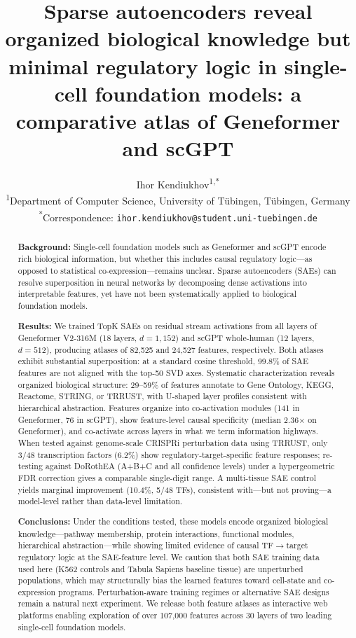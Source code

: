 \documentclass[onecolumn]{article}
\title{\textbf{Sparse autoencoders reveal organized biological knowledge but minimal regulatory logic in single-cell foundation models: a comparative atlas of Geneformer and scGPT}}
\author{Ihor Kendiukhov\textsuperscript{1,*}\\[6pt]
\textsuperscript{1}Department of Computer Science, University of T\"ubingen, T\"ubingen, Germany\\
\textsuperscript{*}Correspondence: \texttt{ihor.kendiukhov@student.uni-tuebingen.de}}
\date{}
\begin{document}
\maketitle

\begin{abstract}

\textbf{Background:}
Single-cell foundation models such as Geneformer and scGPT encode rich biological information, but whether this includes causal regulatory logic---as opposed to statistical co-expression---remains unclear. Sparse autoencoders (SAEs) can resolve superposition in neural networks by decomposing dense activations into interpretable features, yet have not been systematically applied to biological foundation models.

\textbf{Results:}
We trained TopK SAEs on residual stream activations from all layers of Geneformer V2-316M (18 layers, $d{=}1{,}152$) and scGPT whole-human (12 layers, $d{=}512$), producing atlases of 82,525 and 24,527 features, respectively. Both atlases exhibit substantial superposition: at a standard cosine threshold, 99.8\% of SAE features are not aligned with the top-50 SVD axes. Systematic characterization reveals organized biological structure: 29--59\% of features annotate to Gene Ontology, KEGG, Reactome, STRING, or TRRUST, with U-shaped layer profiles consistent with hierarchical abstraction. Features organize into co-activation modules (141 in Geneformer, 76 in scGPT), show feature-level causal specificity (median 2.36$\times$ on Geneformer), and co-activate across layers in what we term information highways. When tested against genome-scale CRISPRi perturbation data using TRRUST, only 3/48 transcription factors (6.2\%) show regulatory-target-specific feature responses; re-testing against DoRothEA (A+B+C and all confidence levels) under a hypergeometric FDR correction gives a comparable single-digit range. A multi-tissue SAE control yields marginal improvement (10.4\%, 5/48 TFs), consistent with---but not proving---a model-level rather than data-level limitation.

\textbf{Conclusions:}
Under the conditions tested, these models encode organized biological knowledge---pathway membership, protein interactions, functional modules, hierarchical abstraction---while showing limited evidence of causal TF$\to$target regulatory logic at the SAE-feature level. We caution that both SAE training data used here (K562 controls and Tabula Sapiens baseline tissue) are unperturbed populations, which may structurally bias the learned features toward cell-state and co-expression programs. Perturbation-aware training regimes or alternative SAE designs remain a natural next experiment. We release both feature atlases as interactive web platforms enabling exploration of over 107,000 features across 30 layers of two leading single-cell foundation models.
\end{abstract}
\end{document}
